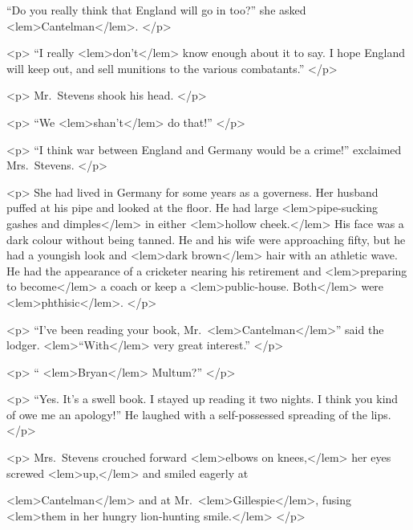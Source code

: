 {{				“Do you really think that England will go in too?” she asked 
<lem>Cantelman</lem>{}. 
				</p> 

				<p>
“I really 
<lem>don't</lem>{} know enough about it to say. I hope England will keep out, and 
				sell munitions to the various combatants.” 
 				</p> 

				<p>
				Mr.\ Stevens shook his head. 
 				</p> 

				<p>
				“We 
<lem>shan't</lem>
					{} 
				do that!” 
 				</p> 

				<p>
				“I think war between England and Germany would be a crime!” exclaimed Mrs.\ 
				Stevens. 
 				</p> 

				<p>
				She had lived in Germany for some years as a governess. Her husband puffed at 
				his pipe and looked at the floor. He had large 
<lem>pipe-sucking gashes and dimples</lem>
					{} 
				in either 
<lem>hollow cheek.</lem>
					{} 
				His face was a dark colour without being tanned. 
				He and his wife were approaching fifty, but he had a youngish look and 
<lem>dark brown</lem>
					{} 
				hair with an athletic wave. He had the appearance of a cricketer nearing his 
				retirement and 
<lem>preparing to become</lem>
					{} 
				a coach or keep a 
<lem>public-house. Both</lem>
					{} 
				were 
<lem>phthisic</lem>{}. 
 				</p> 

				<p>
				“I've been reading your book, Mr.\ 
<lem>Cantelman</lem>{}” said the lodger.  
<lem>“With</lem>
					{\Bfootnote{With}} 
				very great 
				interest.” 
 				</p> 

				<p>
				“
<lem>Bryan</lem>{} Multum?” 
 				</p> 

				<p>
				“Yes. It's a swell book. I stayed up reading it two nights. I think you kind of 
				owe me an apology!” He laughed with a self-possessed spreading of the lips. 
 				</p> 

				<p>
				Mrs.\ Stevens crouched forward 
<lem>elbows on knees,</lem>
					{} 
				her eyes screwed 
<lem>up,</lem>
					{} 
				and smiled eagerly at 
				
<lem>Cantelman</lem>{} and at Mr.\ 
<lem>Gillespie</lem>{}, 
				fusing 
<lem>them in her hungry lion-hunting smile.</lem>
					{}  
 				</p> 

}}
